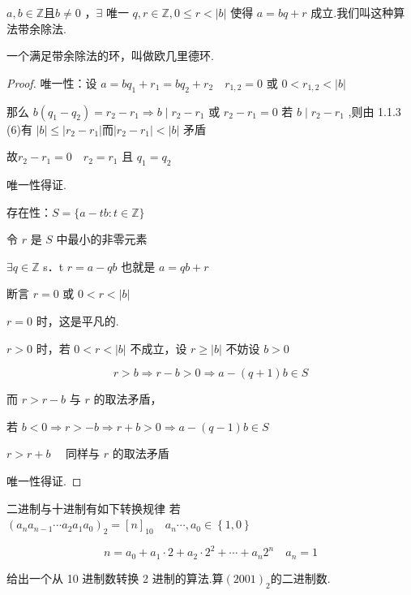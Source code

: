 \begin{theorem}
	$a, b \in \mathbb{Z}\textbf{且} b \neq 0$ ，$\exists$ 唯一 $q, r \in \mathbb{Z}, 0 \leq r<|b|$ 使得 $a=b q+r$
	成立.我们叫这种算法带余除法.
	
\end{theorem}
一个满足带余除法的环，叫做欧几里德环.
\begin{proof}
	唯一性：设 $a=b q_1+r_1=b q_2+r_2 \quad r_{1,2}=0$ 或 $0<r_{1,2}<|b|$
	
	那么 $b\left(q_1-q_2\right)=r_2-r_1 \Rightarrow b \mid r_2-r_1$ 或 $r_2-r_1=0$
	若 $b \mid r_2-r_1$ ,则由 1.1.3 (6)有 $|b| \leqslant\left|r_2-r_1\right|$而$\left|r_2-r_1\right|<|b|$ 矛盾
	
	故$r_2-r_1=0 \quad r_2=r_1$ 且 $q_1=q_2 \quad$ 
	
	唯一性得证.
	
	存在性：$S=\{a-t b: t \in \mathbb{Z}\}$
	
	令 $r$ 是 $S$ 中最小的非零元素
	
	$\exists q \in \mathbb{Z}$ s．t $r=a-q b$ 也就是 $a=q b+r$
	
	
	断言 $r=0$ 或 $0<r<|b|$
	
	
	$r=0$ 时，这是平凡的.
	
	$r>0$ 时，若 $0<r<|b|$ 不成立，设 $r \geqslant|b|$ 不妨设 $b>0$
	
	$$
	r>b \Rightarrow r-b>0 \Rightarrow a-(q+1) b \in S
	$$
	
	
	而 $r>r-b$ 与 $r$ 的取法矛盾，
	
	若 $b<0 \Rightarrow r>-b \Rightarrow r+b>0 \Rightarrow a-(q-1) b \in S$
	
	$r>r+b \quad$ 同样与 $r$ 的取法矛盾
	
	唯一性得证.
\end{proof}
\begin{problem}
	二进制与十进制有如下转换规律
	若 $\left(a_n a_{n-1} \cdots a_2 a_1 a_0\right)_2=[n]_{10} \quad a_n \cdots, a_0 \in\left\{1,0\right\}$
	
	$$
	n=a_0+a_1 \cdot 2+a_2 \cdot 2^2+\cdots+a_n 2^n \quad a_n=1
	$$
	
	
	给出一个从 10 进制数转换 2 进制的算法.算$(2001)_{2}$的二进制数.
	
	
\end{problem}
